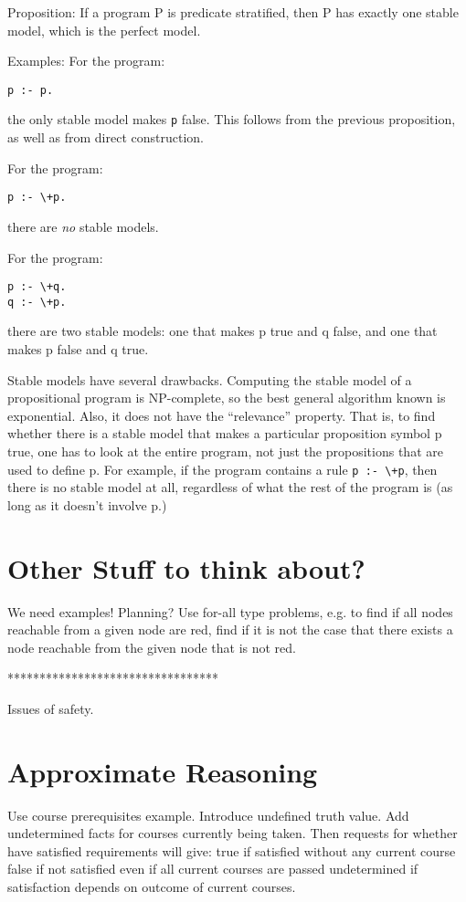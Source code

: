 Proposition: If a program P is predicate stratified, then P has
exactly one stable model, which is the perfect model.

Examples:  For the program:
\begin{verbatim}
p :- p.
\end{verbatim}
the only stable model makes \verb|p| false.  This follows from the
previous proposition, as well as from direct construction.

For the program:
\begin{verbatim}
p :- \+p.
\end{verbatim}
there are {\em no} stable models.

For the program: 
\begin{verbatim}
p :- \+q.
q :- \+p.
\end{verbatim}
there are two stable models: one that makes p true and q false, and
one that makes p false and q true.

Stable models have several drawbacks.  Computing the stable model of a
propositional program is NP-complete, so the best general algorithm
known is exponential.  Also, it does not have the ``relevance''
property.  That is, to find whether there is a stable model that makes
a particular proposition symbol p true, one has to look at the entire
program, not just the propositions that are used to define p.  For
example, if the program contains a rule \verb|p :- \+p|, then there is
no stable model at all, regardless of what the rest of the program is
(as long as it doesn't involve p.)




\section{Other Stuff to think about?}

We need examples! Planning? Use for-all type problems, e.g. to find if
all nodes reachable from a given node are red, find if it is not the
case that there exists a node reachable from the given node that is
not red.


*********************************

Issues of safety.


\section{Approximate Reasoning}

Use course prerequisites example. Introduce undefined truth value.  Add
undetermined facts for courses currently being taken.  Then requests for 
whether have satisfied requirements will give:
	true if satisfied without any current course
	false if not satisfied even if all current courses are passed
	undetermined if satisfaction depends on outcome of current courses.



